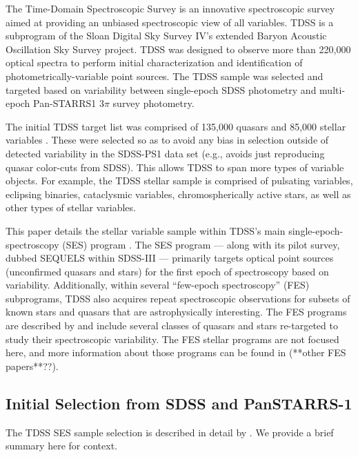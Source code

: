 \documentclass[twocolumn, tighten, astrosymb]{aastex631}
\begin{document}
The Time-Domain Spectroscopic Survey \citep[TDSS;][]{Morganson2015} is an innovative spectroscopic survey aimed at providing an unbiased spectroscopic view of all variables. TDSS is a subprogram of the Sloan Digital Sky Survey IV's \citep[SDSS-IV;][]{SDSS_4}  extended Baryon Acoustic Oscillation Sky Survey  \citep[eBOSS;][]{EBOSS} project. TDSS was designed to observe more than 220,000 optical spectra to perform initial characterization and identification of photometrically-variable point sources. The TDSS sample was selected and targeted based on variability between single-epoch SDSS photometry and multi-epoch Pan-STARRS1 3$\pi$ survey \citep[PS1;][]{PS1_1, PS1_2} photometry.

The initial TDSS target list was comprised of 135,000 quasars and 85,000 stellar variables \citep{Morganson2015}. These were selected so as to avoid any bias in selection outside of detected variability in the SDSS-PS1 data set (e.g., avoids just reproducing quasar color-cuts from SDSS). This allows TDSS to span more types of variable objects. For example, the TDSS stellar sample is comprised of pulsating variables, eclipsing binaries, cataclysmic variables, chromospherically active stars, as well as other types of stellar variables. 

This paper details the stellar variable sample within TDSS's main single-epoch-spectroscopy (SES) program \citep{Morganson2015}. The SES program --- along with its pilot survey, dubbed SEQUELS within SDSS-III \citep{Ruan2016} --- primarily targets optical point sources (unconfirmed quasars and stars) for the first epoch of spectroscopy based on variability.  Additionally, within several ``few-epoch spectroscopy'' (FES) subprograms, TDSS also acquires repeat spectroscopic observations for subsets of known stars and quasars that are astrophysically interesting.  The FES programs are described by \citet{MacLeod2018} and include several classes of quasars and stars re-targeted to study their spectroscopic variability. The FES stellar programs are not focused here, and more information about those programs can be found in \citet{MacLeod2018, Roulston2019} (**other FES papers**??).


\subsection{Initial Selection from SDSS and PanSTARRS-1}

The TDSS SES sample selection is described in detail by \citet{Morganson2015}. We provide a brief summary here for context. 
\end{document}
